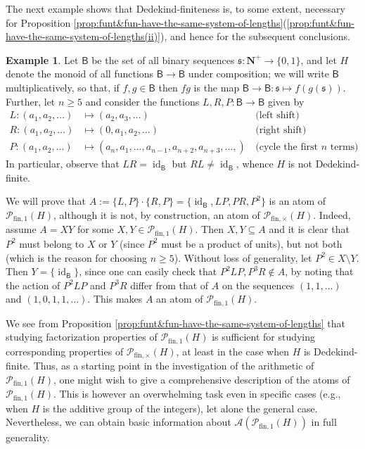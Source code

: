 \documentclass{report}
\renewcommand{\P}{\mathcal{P}}
\newcommand{\funt}{{\textrm{fin}, \times}}
\newcommand{\fun}{{\textrm{fin}, 1}}
\renewcommand{\:}{\text{:}}
\theoremstyle{definition}
\newtheorem{eg}[defn]{Example}
\begin{document}
%
The next example shows that Dedekind-finiteness is, to some extent, necessary for Proposition \ref{prop:funt&fun-have-the-same-system-of-lengths}(\ref{prop:funt&fun-have-the-same-system-of-lengths(ii)}), and hence for the subsequent conclusions.
%
\begin{eg}
Let $\mathsf{B}$ be the set of all binary sequences $\mathfrak{s}: \mathbf N^+ \to \{0,1\}$, and let $H$ denote the monoid of all functions $\mathsf{B} \to \mathsf{B}$ under composition; we will write $\mathsf{B}$ multiplicatively, so that, if $f, g \in \mathsf{B}$ then $fg$ is the map $\mathsf{B} \to \mathsf{B}: \mathfrak{s} \mapsto f(g(\mathfrak s))$.
Further, let $n\ge 5$ and consider the functions $L,R,P:\mathsf{B} \to\mathsf{B}$ given by
\begin{align*}
L: (a_1,a_2,\dots) &\mapsto (a_2,a_3,\dots)  &\,\textrm{(left shift)}\\
R: (a_1,a_2,\dots) &\mapsto (0,a_1,a_2,\dots) &\,\textrm{(right shift)}\\
P: (a_1,a_2,\dots) &\mapsto (a_{n},a_1,\dots, a_{n-1}, a_{n+2}, a_{n+3},\dots,) &\,\textrm{(cycle the first $n$ terms)}
\end{align*}
In particular, observe that $LR = \operatorname{id}_\mathsf{B}$ but $RL \neq \operatorname{id}_\mathsf{B}$, whence $H$ is not Dedekind-finite.

We will prove that $A:= \{L,P\} \cdot \{R,P\} = \{\operatorname{id}_\mathsf{B}, LP, PR, P^2 \}$ is an atom of $\P_\fun(H)$, although it is not, by construction, an atom of $\P_\funt(H)$. Indeed,
assume $A = XY$ for some $X,Y\in \P_\fun(H)$.
Then $X,Y\subseteq A$ and it is clear that $P^2$ must belong to $X$ or $Y$ (since $P^2$ must be a product of units), but not both (which is the reason for choosing $n\ge 5$).
Without loss of generality, let $P^2 \in X \setminus Y$.
Then $Y = \{\operatorname{id}_\mathsf{B}\}$, since one can easily check that $P^2LP, P^3R \notin A$, by noting that the action of $P^2LP$ and $P^3R$ differ from that of $A$ on the sequences $(1,1,\ldots)$ and $(1,0,1,1,\ldots)$. This makes $A$ an atom of $\P_\fun(H)$.
\end{eg}
%
We see from Proposition \ref{prop:funt&fun-have-the-same-system-of-lengths} that studying factorization properties of $\P_\fun(H)$ is sufficient for studying corresponding properties of $\P_\funt(H)$, at least in the case when $H$ is Dedekind-finite.
Thus, as a starting point in the investigation of the arithmetic of $\P_\fun(H)$, one might wish to give a comprehensive description of
the atoms of $\P_\fun(H)$.
This is however an overwhelming task even in specific cases (e.g., when $H$ is the additive group of the integers), let alone the general case. Nevertheless, we can obtain basic information about $\mathscr A(\P_\fun(H))$ in full generality.
\end{document}

